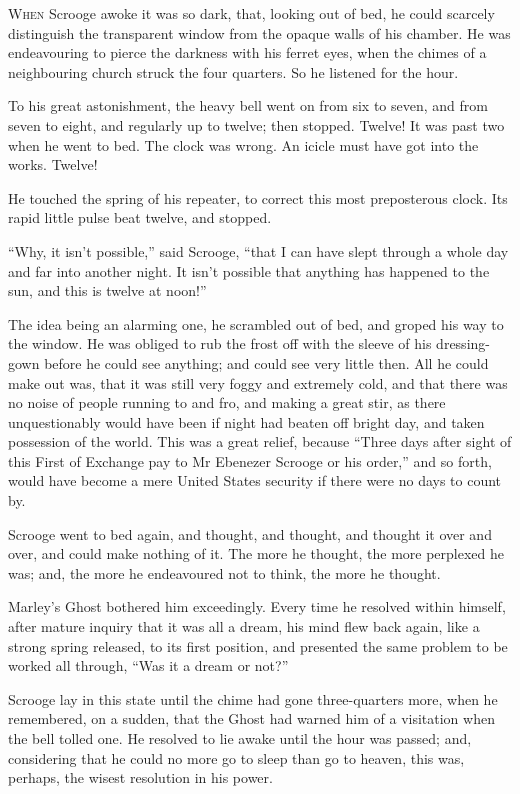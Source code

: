 \documentclass[paper=5.5in:8.5in,BCOR=10mm,twoside,DIV=15,12pt,usegeometry,openany]{scrbook} %
\begin{document}
\lettrine[loversize=.85]{W}{hen} Scrooge awoke it was so dark, that, looking out of bed, he could scarcely distinguish the transparent window from the opaque walls of his chamber. He was endeavouring to pierce the darkness with his ferret eyes, when the chimes of a neighbouring church struck the four quarters. So he listened for the hour.

To his great astonishment, the heavy bell went on from six to seven, and from seven to eight, and regularly up to twelve; then stopped. Twelve! It was past two when he went to bed. The clock was wrong. An icicle must have got into the works. Twelve!

He touched the spring of his repeater, to correct this most preposterous clock. Its rapid little pulse beat twelve, and stopped.

\enquote{Why, it isn't possible,} said Scrooge, \enquote{that I can have slept through a whole day and far into another night. It isn't possible that anything has happened to the sun, and this is twelve at noon!}

The idea being an alarming one, he scrambled out of bed, and groped his way to the window. He was obliged to rub the frost off with the sleeve of his dressing-gown before he could see anything; and could see very little then. All he could make out was, that it was still very foggy and extremely cold, and that there was no noise of people running to and fro, and making a great stir, as there unquestionably would have been if night had beaten off bright day, and taken possession of the world. This was a great relief, because \enquote{Three days after sight of this First of Exchange pay to Mr Ebenezer Scrooge or his order,} and so forth, would have become a mere United States security if there were no days to count by.

Scrooge went to bed again, and thought, and thought, and thought it over and over, and could make nothing of it. The more he thought, the more perplexed he was; and, the more he endeavoured not to think, the more he thought.

Marley's Ghost bothered him exceedingly. Every time he resolved within himself, after mature inquiry that it was all a dream, his mind flew back again, like a strong spring released, to its first position, and presented the same problem to be worked all through, \enquote{Was it a dream or not?}

Scrooge lay in this state until the chime had gone three-quarters more, when he remembered, on a sudden, that the Ghost had warned him of a visitation when the bell tolled one. He resolved to lie awake until the hour was passed; and, considering that he could no more go to sleep than go to heaven, this was, perhaps, the wisest resolution in his power.
\end{document}
